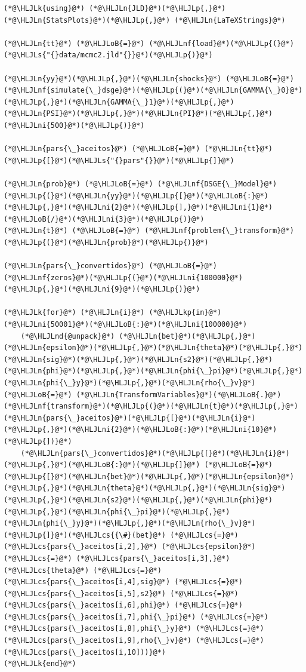\documentclass[12pt,a4paper]{article}
\newcommand{\HLJLk}[1]{\textcolor[RGB]{148,91,176}{\textbf{#1}}}
\newcommand{\HLJLkp}[1]{\textcolor[RGB]{148,91,176}{\textbf{#1}}}
\newcommand{\HLJLn}[1]{#1}
\newcommand{\HLJLnd}[1]{\textcolor[RGB]{214,102,97}{#1}}
\newcommand{\HLJLnf}[1]{\textcolor[RGB]{66,102,213}{#1}}
\newcommand{\HLJLs}[1]{\textcolor[RGB]{201,61,57}{#1}}
\newcommand{\HLJLni}[1]{\textcolor[RGB]{59,151,46}{#1}}
\newcommand{\HLJLoB}[1]{\textcolor[RGB]{102,102,102}{\textbf{#1}}}
\newcommand{\HLJLp}[1]{#1}
\newcommand{\HLJLcs}[1]{\textcolor[RGB]{153,153,119}{\textit{#1}}}
\begin{document}
\begin{lstlisting}
(*@\HLJLk{using}@*) (*@\HLJLn{JLD}@*)(*@\HLJLp{,}@*) (*@\HLJLn{StatsPlots}@*)(*@\HLJLp{,}@*) (*@\HLJLn{LaTeXStrings}@*)

(*@\HLJLn{tt}@*) (*@\HLJLoB{=}@*) (*@\HLJLnf{load}@*)(*@\HLJLp{(}@*)(*@\HLJLs{"{}data/mcmc2.jld"{}}@*)(*@\HLJLp{)}@*)

(*@\HLJLn{yy}@*)(*@\HLJLp{,}@*)(*@\HLJLn{shocks}@*) (*@\HLJLoB{=}@*) (*@\HLJLnf{simulate{\_}dsge}@*)(*@\HLJLp{(}@*)(*@\HLJLn{GAMMA{\_}0}@*)(*@\HLJLp{,}@*)(*@\HLJLn{GAMMA{\_}1}@*)(*@\HLJLp{,}@*)(*@\HLJLn{PSI}@*)(*@\HLJLp{,}@*)(*@\HLJLn{PI}@*)(*@\HLJLp{,}@*)(*@\HLJLni{500}@*)(*@\HLJLp{)}@*)

(*@\HLJLn{pars{\_}aceitos}@*) (*@\HLJLoB{=}@*) (*@\HLJLn{tt}@*)(*@\HLJLp{[}@*)(*@\HLJLs{"{}pars"{}}@*)(*@\HLJLp{]}@*)

(*@\HLJLn{prob}@*) (*@\HLJLoB{=}@*) (*@\HLJLnf{DSGE{\_}Model}@*)(*@\HLJLp{(}@*)(*@\HLJLn{yy}@*)(*@\HLJLp{[}@*)(*@\HLJLoB{:}@*)(*@\HLJLp{,}@*)(*@\HLJLni{2}@*)(*@\HLJLp{],}@*)(*@\HLJLni{1}@*)(*@\HLJLoB{/}@*)(*@\HLJLni{3}@*)(*@\HLJLp{)}@*)
(*@\HLJLn{t}@*) (*@\HLJLoB{=}@*) (*@\HLJLnf{problem{\_}transform}@*)(*@\HLJLp{(}@*)(*@\HLJLn{prob}@*)(*@\HLJLp{)}@*)

(*@\HLJLn{pars{\_}convertidos}@*) (*@\HLJLoB{=}@*) (*@\HLJLnf{zeros}@*)(*@\HLJLp{(}@*)(*@\HLJLni{100000}@*)(*@\HLJLp{,}@*)(*@\HLJLni{9}@*)(*@\HLJLp{)}@*)

(*@\HLJLk{for}@*) (*@\HLJLn{i}@*) (*@\HLJLkp{in}@*) (*@\HLJLni{50001}@*)(*@\HLJLoB{:}@*)(*@\HLJLni{100000}@*)
    (*@\HLJLnd{@unpack}@*) (*@\HLJLn{bet}@*)(*@\HLJLp{,}@*)(*@\HLJLn{epsilon}@*)(*@\HLJLp{,}@*)(*@\HLJLn{theta}@*)(*@\HLJLp{,}@*)(*@\HLJLn{sig}@*)(*@\HLJLp{,}@*)(*@\HLJLn{s2}@*)(*@\HLJLp{,}@*)(*@\HLJLn{phi}@*)(*@\HLJLp{,}@*)(*@\HLJLn{phi{\_}pi}@*)(*@\HLJLp{,}@*)(*@\HLJLn{phi{\_}y}@*)(*@\HLJLp{,}@*)(*@\HLJLn{rho{\_}v}@*) (*@\HLJLoB{=}@*) (*@\HLJLn{TransformVariables}@*)(*@\HLJLoB{.}@*)(*@\HLJLnf{transform}@*)(*@\HLJLp{(}@*)(*@\HLJLn{t}@*)(*@\HLJLp{,}@*)(*@\HLJLn{pars{\_}aceitos}@*)(*@\HLJLp{[}@*)(*@\HLJLn{i}@*)(*@\HLJLp{,}@*)(*@\HLJLni{2}@*)(*@\HLJLoB{:}@*)(*@\HLJLni{10}@*)(*@\HLJLp{])}@*)
    (*@\HLJLn{pars{\_}convertidos}@*)(*@\HLJLp{[}@*)(*@\HLJLn{i}@*)(*@\HLJLp{,}@*)(*@\HLJLoB{:}@*)(*@\HLJLp{]}@*) (*@\HLJLoB{=}@*) (*@\HLJLp{[}@*)(*@\HLJLn{bet}@*)(*@\HLJLp{,}@*)(*@\HLJLn{epsilon}@*)(*@\HLJLp{,}@*)(*@\HLJLn{theta}@*)(*@\HLJLp{,}@*)(*@\HLJLn{sig}@*)(*@\HLJLp{,}@*)(*@\HLJLn{s2}@*)(*@\HLJLp{,}@*)(*@\HLJLn{phi}@*)(*@\HLJLp{,}@*)(*@\HLJLn{phi{\_}pi}@*)(*@\HLJLp{,}@*)(*@\HLJLn{phi{\_}y}@*)(*@\HLJLp{,}@*)(*@\HLJLn{rho{\_}v}@*)(*@\HLJLp{]}@*)(*@\HLJLcs{{\#}(bet}@*) (*@\HLJLcs{=}@*) (*@\HLJLcs{pars{\_}aceitos[i,2],}@*) (*@\HLJLcs{epsilon}@*) (*@\HLJLcs{=}@*) (*@\HLJLcs{pars{\_}aceitos[i,3],}@*) (*@\HLJLcs{theta}@*) (*@\HLJLcs{=}@*) (*@\HLJLcs{pars{\_}aceitos[i,4],sig}@*) (*@\HLJLcs{=}@*) (*@\HLJLcs{pars{\_}aceitos[i,5],s2}@*) (*@\HLJLcs{=}@*) (*@\HLJLcs{pars{\_}aceitos[i,6],phi}@*) (*@\HLJLcs{=}@*) (*@\HLJLcs{pars{\_}aceitos[i,7],phi{\_}pi}@*) (*@\HLJLcs{=}@*) (*@\HLJLcs{pars{\_}aceitos[i,8],phi{\_}y}@*) (*@\HLJLcs{=}@*) (*@\HLJLcs{pars{\_}aceitos[i,9],rho{\_}v}@*) (*@\HLJLcs{=}@*) (*@\HLJLcs{pars{\_}aceitos[i,10]))}@*)
(*@\HLJLk{end}@*)
\end{lstlisting}
\end{document}
